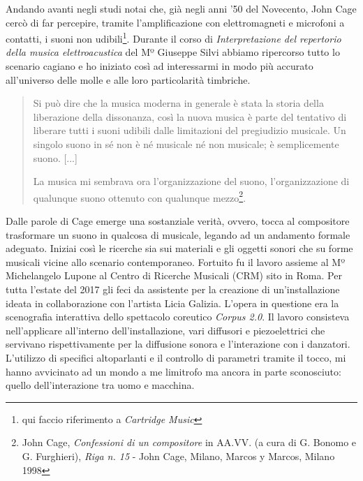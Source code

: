 Andando avanti negli studi notai che, già negli anni '50 del Novecento, John Cage cercò di far percepire, tramite l'amplificazione con elettromagneti e microfoni a contatti, i suoni non udibili\footnote{qui faccio riferimento a \textit{Cartridge Music}}. Durante il corso di \textit{Interpretazione del repertorio della musica elettroacustica} del Mº Giuseppe Silvi abbiamo ripercorso tutto lo scenario cagiano e ho iniziato così ad interessarmi in modo più accurato all'universo delle molle e alle loro particolarità timbriche.

\begin{small}
\begin{quotation}
Si può dire che la musica moderna in generale è stata la storia della liberazione della dissonanza, così la nuova musica è parte del tentativo di liberare tutti i suoni udibili dalle limitazioni del pregiudizio musicale.
Un singolo suono in sé non è né musicale né non musicale; è semplicemente suono. [...]

La musica mi sembrava ora l'organizzazione del suono, l'organizzazione di qualunque suono ottenuto con qualunque mezzo\footnote{John Cage, \textit{Confessioni di un compositore} in AA.VV. (a cura di G. Bonomo e G. Furghieri), \textit{Riga n. 15} - John Cage, Milano, Marcos y Marcos, Milano 1998}.
\end{quotation}
\end{small}

Dalle parole di Cage emerge una sostanziale verità, ovvero, tocca al compositore trasformare un suono in qualcosa di musicale, legando ad un andamento formale adeguato. Iniziai così le ricerche sia sui materiali e gli oggetti sonori che su forme musicali vicine allo scenario contemporaneo. Fortuito fu il lavoro assieme al Mº Michelangelo Lupone al Centro di Ricerche Musicali (CRM) sito in Roma. Per tutta l'estate del 2017 gli feci da assistente per la creazione di un'installazione ideata in collaborazione con l'artista Licia Galizia. L'opera in questione era la scenografia interattiva dello spettacolo coreutico \textit{Corpus 2.0}. Il lavoro consisteva nell'applicare all'interno dell'installazione, vari diffusori e piezoelettrici che servivano rispettivamente per la diffusione sonora e l'interazione con i danzatori. L'utilizzo di specifici altoparlanti e il controllo di parametri tramite il tocco, mi hanno avvicinato ad un mondo a me limitrofo ma ancora in parte sconosciuto: quello dell'interazione tra uomo e macchina.


